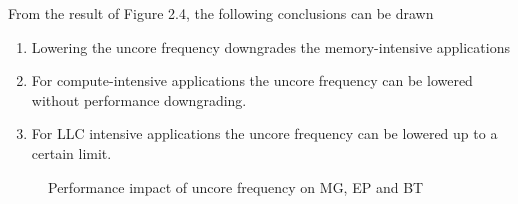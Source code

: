 From the result of Figure 2.4, the following conclusions can be drawn
\begin{enumerate}
\item Lowering the uncore frequency downgrades the memory-intensive applications
\item For compute-intensive applications the uncore frequency can be lowered without performance downgrading.
\item For LLC intensive applications the uncore frequency can be lowered up to a certain limit.
\end{enumerate}

\begin{figure}
  \centering
  \hspace{0.000001in}
     \hspace{0.000001in}
  \caption{Performance impact of uncore frequency on MG, EP and BT}
  \label{fig:subfig} %
\end{figure}


